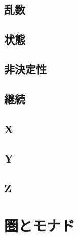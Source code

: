 \documentclass[twocolumn]{jsbook}
\begin{document}
\chapter{乱数}

\chapter{状態}

\chapter{非決定性}

\chapter{継続}

\chapter{X}

\chapter{Y}

\chapter{Z}


\part{圏とモナド}
\end{document}
